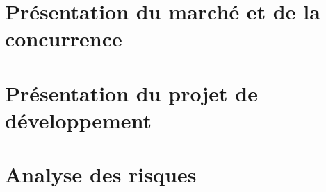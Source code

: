 \documentclass[a4paper,12pt]{report}
\begin{document}
\section{Présentation du marché et de la concurrence}
\section{Présentation du projet de développement}
\section{Analyse des risques}
\end{document}
